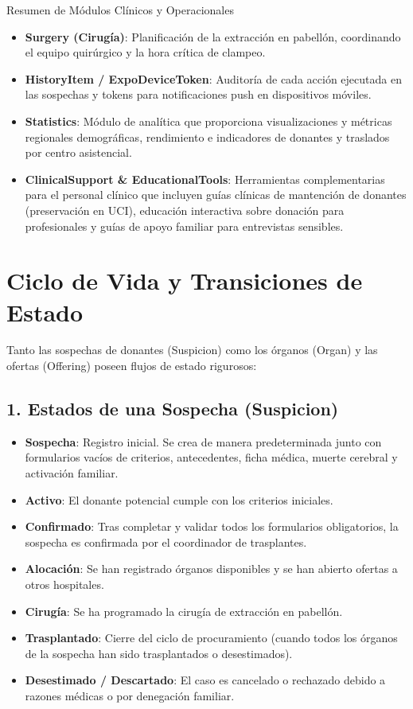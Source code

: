 \documentclass[11pt, a4paper]{article}
\begin{document}
\begin{temariobox}{Resumen de Módulos Clínicos y Operacionales}
\begin{itemize}
    \item \textbf{Surgery (Cirugía)}: Planificación de la extracción en pabellón, coordinando el equipo quirúrgico y la hora crítica de clampeo.
    \item \textbf{HistoryItem / ExpoDeviceToken}: Auditoría de cada acción ejecutada en las sospechas y tokens para notificaciones push en dispositivos móviles.
    \item \textbf{Statistics}: Módulo de analítica que proporciona visualizaciones y métricas regionales demográficas, rendimiento e indicadores de donantes y traslados por centro asistencial.
    \item \textbf{ClinicalSupport \& EducationalTools}: Herramientas complementarias para el personal clínico que incluyen guías clínicas de mantención de donantes (preservación en UCI), educación interactiva sobre donación para profesionales y guías de apoyo familiar para entrevistas sensibles.
\end{itemize}
\end{temariobox}

\newpage

\section{Ciclo de Vida y Transiciones de Estado}
Tanto las sospechas de donantes (Suspicion) como los órganos (Organ) y las ofertas (Offering) poseen flujos de estado rigurosos:

\subsection{1. Estados de una Sospecha (Suspicion)}
\begin{itemize}
    \item \textbf{Sospecha}: Registro inicial. Se crea de manera predeterminada junto con formularios vacíos de criterios, antecedentes, ficha médica, muerte cerebral y activación familiar.
    \item \textbf{Activo}: El donante potencial cumple con los criterios iniciales.
    \item \textbf{Confirmado}: Tras completar y validar todos los formularios obligatorios, la sospecha es confirmada por el coordinador de trasplantes.
    \item \textbf{Alocación}: Se han registrado órganos disponibles y se han abierto ofertas a otros hospitales.
    \item \textbf{Cirugía}: Se ha programado la cirugía de extracción en pabellón.
    \item \textbf{Trasplantado}: Cierre del ciclo de procuramiento (cuando todos los órganos de la sospecha han sido trasplantados o desestimados).
    \item \textbf{Desestimado / Descartado}: El caso es cancelado o rechazado debido a razones médicas o por denegación familiar.
\end{itemize}
\end{document}
